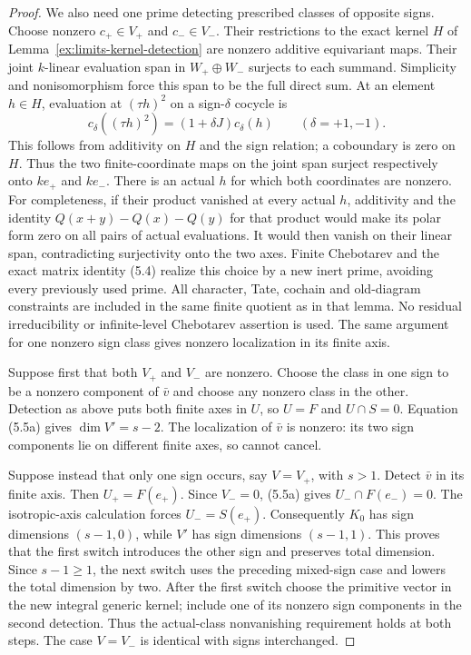 \documentclass[11pt]{article}
\theoremstyle{definition}
\theoremstyle{remark}
\begin{document}
\begin{proof}
We also need one prime detecting prescribed classes of opposite
signs. Choose nonzero $c_+\in V_+$ and $c_-\in V_-$.
Their restrictions to the exact kernel $H$ of
Lemma~\ref{ex:limits-kernel-detection} are nonzero additive equivariant
maps. Their joint $k$-linear evaluation span in $W_+\oplus W_-$
surjects to each summand. Simplicity and nonisomorphism force this
span to be the full direct sum. At an element $h\in H$, evaluation
at $(\tau h)^2$ on a sign-$\delta$ cocycle is
\[
 c_\delta((\tau h)^2)=(1+\delta J)c_\delta(h)
 \qquad(\delta=+1,-1).                                      \tag{5.5b}
\]
This follows from additivity on $H$ and the sign relation; a
coboundary is zero on $H$. Thus the two finite-coordinate maps on
the joint span surject respectively onto $k e_+$ and $k e_-$.
There is an actual $h$ for which both coordinates are nonzero.
For completeness, if their product vanished at every actual $h$,
additivity and the identity
$Q(x+y)-Q(x)-Q(y)$ for that product would make its polar form
zero on all pairs of actual evaluations. It would then vanish on
their linear span, contradicting surjectivity onto the two axes.
Finite Chebotarev and the exact matrix identity (5.4) realize this
choice by a new inert prime, avoiding every previously used prime.
All character, Tate, cochain and old-diagram constraints are included
in the same finite quotient as in that lemma. No residual
irreducibility or infinite-level Chebotarev assertion is used.
The same argument for one nonzero sign class gives nonzero
localization in its finite axis.

Suppose first that both $V_+$ and $V_-$ are nonzero. Choose the
class in one sign to be a nonzero component of $\bar v$ and choose
any nonzero class in the other. Detection as above puts both finite
axes in $U$, so $U=F$ and $U\cap S=0$. Equation (5.5a) gives
$\dim V'=s-2$. The localization of $\bar v$ is nonzero: its two
sign components lie on different finite axes, so cannot cancel.

Suppose instead that only one sign occurs, say $V=V_+$, with
$s>1$. Detect $\bar v$ in its finite axis. Then
$U_+=F(e_+)$. Since $V_-=0$, (5.5a) gives
$U_-\cap F(e_-)=0$. The isotropic-axis calculation forces
$U_-=S(e_+)$. Consequently $K_0$ has sign dimensions $(s-1,0)$,
while $V'$ has sign dimensions $(s-1,1)$. This proves that the first
switch introduces the other sign and preserves total dimension.
Since $s-1\ge1$, the next switch uses the preceding mixed-sign
case and lowers the total dimension by two. After the first switch
choose the primitive vector in the new integral generic kernel;
include one of its nonzero sign components in the second detection.
Thus the actual-class nonvanishing requirement holds at both steps.
The case $V=V_-$ is identical with signs interchanged.


\end{proof}
\end{document}
